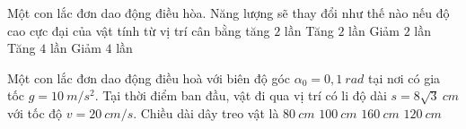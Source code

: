 	\begin{ex} %
		
		Một con lắc đơn dao động điều hòa. Năng lượng sẽ thay đổi như thế nào nếu độ cao cực đại của vật tính từ vị trí cân bằng tăng $2$ lần
		\choice
		{\True Tăng $2$ lần}
		{Giảm $2$ lần}
		{Tăng $4$ lần}
		{Giảm $4$ lần}
	\end{ex}
	\begin{ex}%
		Một con lắc đơn dao động điều hoà với biên độ góc $\alpha_0 = 0,1\ rad$ tại nơi có gia tốc $g = 10\ m/s^2$. Tại thời điểm ban đầu, vật đi qua vị trí có li độ dài $s=8\sqrt{3}\ cm$ với tốc độ $v = 20\ cm/s$. Chiều dài dây treo vật là
		\choice
		{$80\ cm$}
		{$100\ cm$}
		{\True $160\ cm$}
		{$120\ cm$}
	\end{ex}
